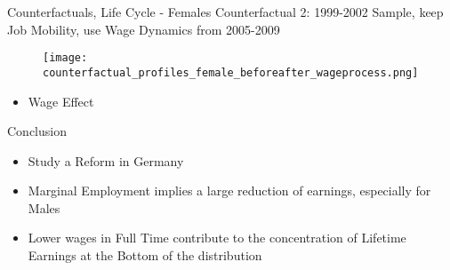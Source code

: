 \documentclass{beamer}
\begin{document}
\begin{frame}{Counterfactuals, Life Cycle - Females}\label{EstimationLCFemalesWage}
Counterfactual 2: 1999-2002 Sample, keep Job Mobility, use Wage Dynamics from 2005-2009
\begin{figure}[!t]
\centering
\begin{minipage}[b]{1\textwidth}{}
\centering
\texttt{[image: counterfactual\_profiles\_female\_beforeafter\_wageprocess.png]}
\end{minipage}
\end{figure}
\begin{itemize}
\setlength{\itemsep}{0.7 cm}
\item Wage Effect
\end{itemize}
\end{frame}


\begin{frame}{Conclusion}\label{Conclusion}
\begin{itemize}
\setlength{\itemsep}{0.7 cm}
\item Study a Reform in Germany
\item Marginal Employment implies a large reduction of earnings, especially for Males
\item Lower wages in Full Time contribute to the concentration of Lifetime Earnings at the Bottom of the distribution 
\vfill
\end{itemize}

\end{frame}




\appendix
\begin{frame}
\end{frame}
\end{document}
